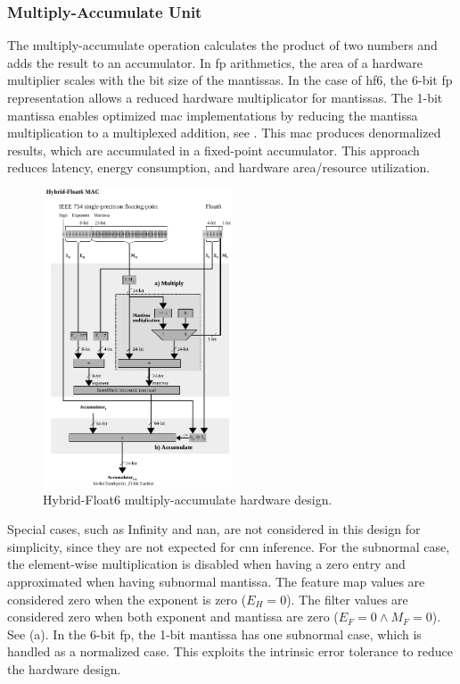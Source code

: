 \subsubsection{Multiply-Accumulate Unit}
The multiply-accumulate operation calculates the product of two numbers and adds the result to an accumulator. In \gls{fp} arithmetics, the area of a hardware multiplier scales with the bit size of the mantissas. In the case of \gls{hf6}, the 6-bit \gls{fp} representation allows a reduced hardware multiplicator for mantissas. The 1-bit mantissa enables optimized \gls{mac} implementations by reducing the mantissa multiplication to a multiplexed addition, see . This \gls{mac} produces denormalized results, which are accumulated in a fixed-point accumulator. This approach reduces latency, energy consumption, and hardware area/resource utilization.

\begin{figure}[h!]
	\centering
	\includegraphics[width=0.5\textwidth]{./chapters/cnn_accelerator/figures/multiplier.pdf}
	\caption{Hybrid-Float6 multiply-accumulate hardware design.}
	\label{fig:multiplier}
\end{figure}

Special cases, such as Infinity and \gls{nan}, are not considered in this design for simplicity, since they are not expected for \gls{cnn} inference. For the subnormal case, the element-wise multiplication is disabled when having a zero entry and approximated when having subnormal mantissa. The feature map values are considered zero when the exponent is zero ($E_H=0$). The filter values are considered zero when both exponent and mantissa are zero ($E_F=0\land M_F=0$). See (a). In the 6-bit \gls{fp}, the 1-bit mantissa has one subnormal case, which is handled as a normalized case. This exploits the intrinsic error tolerance to reduce the hardware design.

